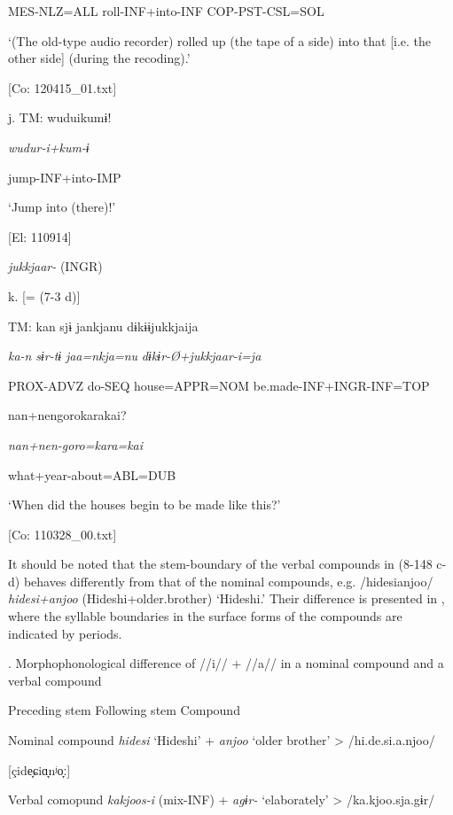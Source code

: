       MES-NLZ=ALL  roll-INF+into-INF  COP-PST-CSL=SOL

      ‘(The old-type audio recorder) rolled up (the tape of a side) into that [i.e. the other side] (during the recoding).’

      [Co: 120415\_01.txt]

  j.  TM:  wuduikumɨ!

      \textit{wudur-i+kum{}-ɨ}

      jump-INF+into-IMP

      ‘Jump into (there)!’

      [El: 110914]

  \textit{jukkjaar-} (INGR)

  k.  [= (7-3 d)]

    TM:  kan  sjɨ  jankjanu  dɨkɨɨjukkjaija

      \textit{ka-n}  \textit{sɨr-tɨ}  \textit{jaa=nkja=nu}  \textit{dɨkɨr-Ø+jukkjaar{}-i=ja}

      PROX-ADVZ  do-SEQ  house=APPR=NOM  be.made-INF+INGR-INF=TOP

      {\textbar}nan+nengoro{\textbar}karakai?

      \textit{nan+nen-goro=kara=kai}

      what+year-about=ABL=DUB

      ‘When did the houses begin to be made like this?’

      [Co: 110328\_00.txt]

It should be noted that the stem-boundary of the verbal compounds in (8-148 c-d) behaves differently from that of the nominal compounds, e.g. /hidesianjoo/ \textit{hidesi+anjoo} (Hideshi+older.brother) ‘Hideshi.’ Their difference is presented in , where the syllable boundaries in the surface forms of the compounds are indicated by periods.

\begin{styleBeschriftung}
\textmd{}\textmd{. Morphophonological difference of //i// + //a// in a nominal compound and a verbal compound}
\end{styleBeschriftung}

  Preceding stem    Following stem    Compound

Nominal compound  \textit{hidesi}  ‘Hideshi’  +  \textit{anjoo}  ‘older brother’  >  /hi.de.si.a.njoo/

[çide̞ɕiɑ̞nʲo̞ː]

Verbal comopund  \textit{kakjoos-i}  (mix-INF)  +  \textit{agɨr-}  ‘elaborately’  >  /ka.kjoo.sja.gɨr/

